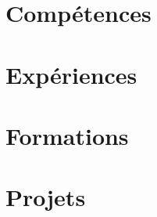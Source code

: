 \documentclass[letter,10pt]{article}
\begin{document}
    

    \section{Compétences}
    

    \section{Expériences}
    

    \section{Formations}
    


    \section{Projets}
    
\end{document}
